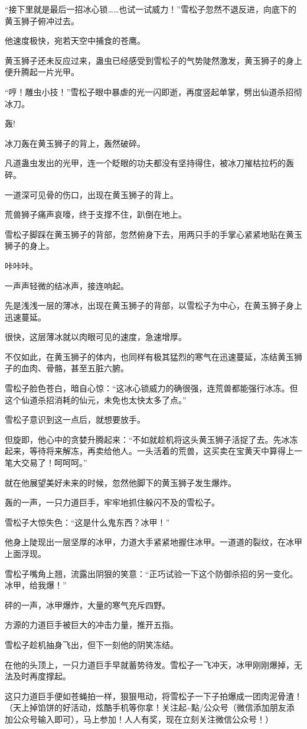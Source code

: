 \begin{this_body}
“接下里就是最后一招冰心锁……也试一试威力！”雪松子忽然不退反进，向底下的黄玉狮子俯冲过去。

他速度极快，宛若天空中捕食的苍鹰。

黄玉狮子还未反应过来，蛊虫已经感受到雪松子的气势陡然激发，黄玉狮子的身上便升腾起一片光甲。

“哼！雕虫小技！”雪松子眼中暴虐的光一闪即逝，再度竖起单掌，劈出仙道杀招彻冰刀。

轰!

冰刀轰在黄玉狮子的背上，轰然破碎。

凡道蛊虫发出的光甲，连一个眨眼的功夫都没有坚持得住，被冰刀摧枯拉朽的轰碎。

一道深可见骨的伤口，出现在黄玉狮子的背上。

荒兽狮子痛声哀嚎，终于支撑不住，趴倒在地上。

雪松子脚踩在黄玉狮子的背部，忽然俯身下去，用两只手的手掌心紧紧地贴在黄玉狮子的身上。

咔咔咔。

一声声轻微的结冰声，接连响起。

先是浅浅一层的薄冰，出现在黄玉狮子的背部，以雪松子为中心，在黄玉狮子身上迅速蔓延。

很快，这层薄冰就以肉眼可见的速度，急速增厚。

不仅如此，在黄玉狮子的体内，也同样有极其猛烈的寒气在迅速蔓延，冻结黄玉狮子的血肉、骨骼，甚至五脏六腑。

雪松子脸色苍白，暗自心惊：“这冰心锁威力的确很强，连荒兽都能强行冰冻。但这个仙道杀招消耗的仙元，未免也太快太多了点。”

雪松子意识到这一点后，就想要放手。

但旋即，他心中的贪婪升腾起来：“不如就趁机将这头黄玉狮子活捉了去。先冰冻起来，等待将来解冻，再卖给他人。一头活着的荒兽，这买卖在宝黄天中算得上一笔大交易了！呵呵呵。”

就在他展望美好未来的时候，忽然他脚下的黄玉狮子发生爆炸。

轰的一声，一只力道巨手，牢牢地抓住躲闪不及的雪松子。

雪松子大惊失色：“这是什么鬼东西？冰甲！”

他身上陡现出一层坚厚的冰甲，力道大手紧紧地握住冰甲。一道道的裂纹，在冰甲上面浮现。

雪松子嘴角上翘，流露出阴狠的笑意：“正巧试验一下这个防御杀招的另一变化。冰甲，给我爆！”

砰的一声，冰甲爆炸，大量的寒气充斥四野。

方源的力道巨手被巨大的冲击力量，推开五指。

雪松子趁机抽身飞出，但下一刻他的阴笑冻结。

在他的头顶上，一只力道巨手早就蓄势待发。雪松子一飞冲天，冰甲刚刚爆掉，无法及时再度撑起。

这只力道巨手便如苍蝇拍一样，狠狠甩动，将雪松子一下子拍爆成一团肉泥骨渣！（天上掉馅饼的好活动，炫酷手机等你拿！关注起\~{}點/公众号（微信添加朋友添加公众号输入即可），马上参加！人人有奖，现在立刻关注微信公众号！）

\end{this_body}

